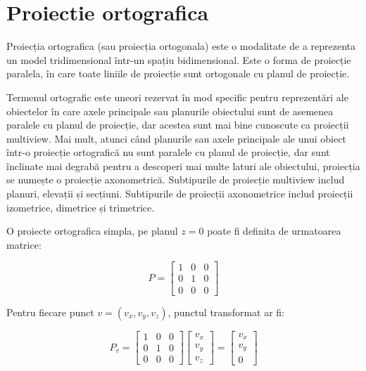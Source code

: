 \newpage
\section{Proiectie ortografica}

Proiecția ortografica (sau proiecția ortogonala) este o modalitate de a reprezenta un model tridimensional  
într-un spațiu bidimensional. Este o forma de proiecție paralela, în care toate liniile de proiecție sunt ortogonale 
cu planul de proiecție.\newline

Termenul ortografic este uneori rezervat în mod specific pentru reprezentări ale obiectelor în care axele principale 
sau planurile obiectului sunt de asemenea paralele cu planul de proiecție, dar acestea sunt mai bine cunoscute 
ca proiecții multiview. Mai mult, atunci când planurile sau axele principale ale unui obiect într-o proiecție 
ortografică nu sunt paralele cu planul de proiecție, dar sunt înclinate mai degrabă pentru a descoperi mai 
multe laturi ale obiectului, proiecția se numește o proiecție axonometrică. Subtipurile de proiecție multiview 
includ planuri, elevații și secțiuni. Subtipurile de proiecții axonometrice includ proiecții izometrice, dimetrice și trimetrice. \newline

O proiecte ortografica simpla, pe planul \(z=0\) poate fi definita de urmatoarea matrice:

\[
P=
  \begin{bmatrix}
    1 & 0 & 0 \\
    0 & 1 & 0 \\
    0 & 0 & 0 
  \end{bmatrix}
\]

Pentru fiecare punct \(v=(v_x,v_y,v_z)\), punctul transformat ar fi:

\[
P_v=
  \begin{bmatrix}
    1 & 0 & 0 \\
    0 & 1 & 0 \\
    0 & 0 & 0 
  \end{bmatrix}
  \begin{bmatrix}
    v_x  \\
    v_y  \\
    v_z  
  \end{bmatrix}
  =
  \begin{bmatrix}
    v_x  \\
    v_y  \\
    0  
  \end{bmatrix}
\]


